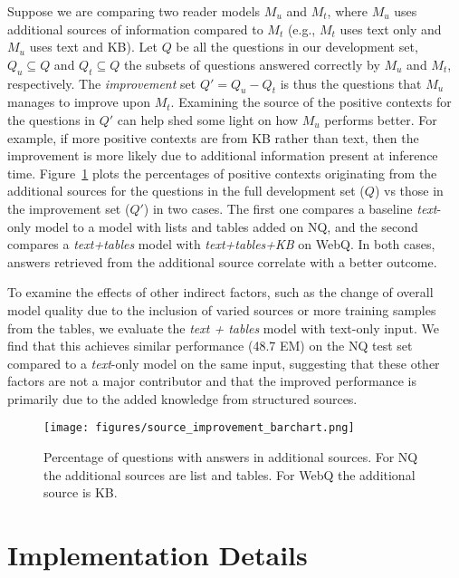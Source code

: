 \documentclass[11pt]{article}
\begin{document}
Suppose we are comparing two reader models $M_u$ and $M_t$, where $M_u$ uses additional sources of information compared to $M_t$ (e.g., $M_t$ uses text only and $M_u$ uses text and KB).
Let $Q$ be all the questions in our development set, $Q_u \subseteq Q$ and $Q_t \subseteq Q$ the subsets of questions answered correctly by $M_u$ and $M_t$, respectively.
The \emph{improvement} set $Q' = Q_u - Q_t$ is thus the questions that $M_u$ manages to improve upon $M_t$.
Examining the source of the positive contexts for the questions in $Q'$ can help shed some light on how $M_u$ performs better.
For example, if more positive contexts are from KB rather than text, then the improvement is more likely due to additional information present at inference time.
Figure~\ref{fig:source_improvement_barchart} plots the percentages of positive contexts originating from the additional sources for the questions in the full development set ($Q$) vs those in the improvement set ($Q'$) in two cases. 
The first one compares a baseline \emph{text}-only model to a model with lists and tables added on NQ, and
the second compares a \emph{text+tables} model with \emph{text+tables+KB} on WebQ.  
In both cases, answers retrieved from the additional source correlate with a better outcome. 

To examine the effects of other indirect factors, such as the change of overall model quality due to the inclusion of varied sources or more training samples from the tables, we evaluate the \emph{text + tables} model with text-only input.  
We find that this achieves similar performance (48.7 EM) on the NQ test set compared to a \emph{text}-only model on the same input, suggesting that these other factors are not a major contributor and that the improved performance is primarily due to the added knowledge from structured sources.


\begin{figure}[t]
    \centering
    \texttt{[image: figures/source\_improvement\_barchart.png]}
    \caption{Percentage of questions with answers in additional sources. For NQ the additional sources are list and tables. For WebQ the additional source is KB.}
    \label{fig:source_improvement_barchart}
    \vspace{-3mm}
\end{figure}


 
\section{Implementation Details}\label{sec:implementation}
\end{document}
